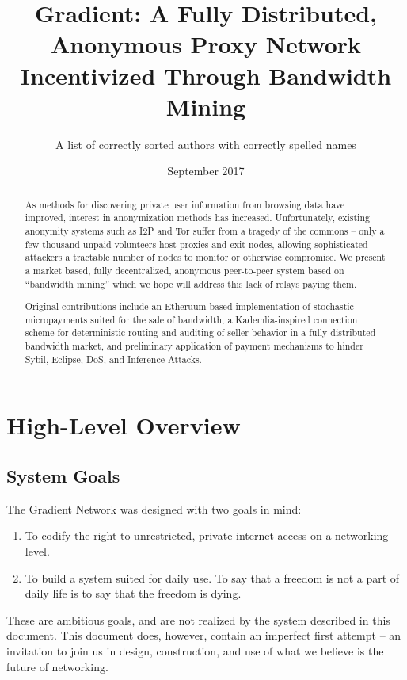 \documentclass{article}
\title{Gradient: A Fully Distributed, Anonymous Proxy Network Incentivized Through Bandwidth Mining}
\author{A list of correctly sorted authors with correctly spelled names}
\date{September 2017}
\begin{document}
\maketitle

\begin{abstract}
    As methods for discovering private user information from browsing data have improved, interest in anonymization methods has increased. Unfortunately, existing anonymity systems such as I2P and Tor suffer from a tragedy of the commons – only a few thousand unpaid volunteers host proxies and exit nodes, allowing sophisticated attackers a tractable number of nodes to monitor or otherwise compromise. We present a market based, fully decentralized, anonymous peer-to-peer system based on “bandwidth mining” which we hope will address this lack of relays paying them.

    Original contributions include an Etheruum-based implementation of stochastic micropayments suited for the sale of bandwidth, a Kademlia-inspired connection scheme for deterministic routing and auditing of seller behavior in a fully distributed bandwidth market, and preliminary application of payment mechanisms to hinder Sybil, Eclipse, DoS, and Inference Attacks.
    
    
\end{abstract}

\tableofcontents
\newpage




\section{High-Level Overview}
\subsection{System Goals}

The Gradient Network was designed with two goals in mind:
\begin{enumerate}
    \item To codify the right to unrestricted, private internet access on a networking level.
    \item To build a system suited for daily use. To say that a freedom is not a part of daily life is to say that the freedom is dying.
\end{enumerate}

These are ambitious goals, and are not realized by the system described in this document. This document does, however, contain an imperfect first attempt – an invitation to join us in design, construction, and use of what we believe is the future of networking.
\end{document}

